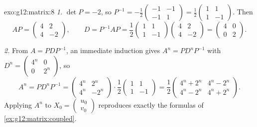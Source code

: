 \begin{solution}{exo:g12:matrix:8}
\emph{1.} $\det P = -2$, so
$P^{-1} = -\frac12\begin{pmatrix} -1 & -1\\ -1 & 1\end{pmatrix}
= \frac12\begin{pmatrix} 1 & 1\\ 1 & -1\end{pmatrix}$. Then
\[
AP = \begin{pmatrix} 4 & 2\\ 4 & -2 \end{pmatrix}, \qquad
D = P^{-1}AP = \frac12\begin{pmatrix} 1&1\\1&-1\end{pmatrix}
\begin{pmatrix} 4&2\\4&-2\end{pmatrix}
= \begin{pmatrix} 4 & 0\\ 0 & 2\end{pmatrix}.
\]

\emph{2.} From $A = PDP^{-1}$, an immediate induction gives
$A^n = PD^nP^{-1}$ with
$D^n = \begin{pmatrix} 4^n & 0\\ 0 & 2^n\end{pmatrix}$, so
\[
A^n = P D^n P^{-1}
= \begin{pmatrix} 4^n & 2^n\\ 4^n & -2^n\end{pmatrix}\cdot
\frac12\begin{pmatrix} 1&1\\1&-1\end{pmatrix}
= \frac12\begin{pmatrix} 4^n + 2^n & 4^n - 2^n\\
4^n - 2^n & 4^n + 2^n\end{pmatrix}.
\]
Applying $A^n$ to $X_0 = \begin{pmatrix} u_0\\v_0\end{pmatrix}$ reproduces
exactly the formulas of \cref{ex:g12:matrix:coupled}.
\end{solution}


